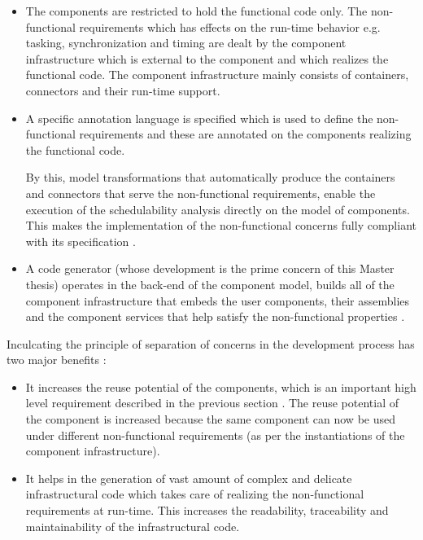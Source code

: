 \begin{description}
\begin{itemize}
\item The components are restricted to hold the functional code only. The non-functional requirements which has effects on the run-time behavior e.g. tasking, synchronization and timing are dealt by the component infrastructure which is external to the component and which realizes the functional code. The component infrastructure mainly consists of containers, connectors and their run-time support.

\item A specific annotation language is specified which is used to define the non-functional requirements and these are annotated on the components realizing the functional code.

By this, model transformations that automatically produce the containers and connectors that serve the non-functional requirements, enable the execution of the schedulability analysis directly on the model of components. This makes the implementation of the non-functional concerns fully compliant with its specification \cite{ScheduAnaly}. 

\item A code generator (whose development is the prime concern of this Master thesis) operates in the back-end of the component model, builds all of the component infrastructure that embeds the user components, their assemblies and the component services that help satisfy the non-functional properties \cite{CharEvoRAVCodeAr}. 
\end{itemize}

Inculcating the principle of separation of concerns in the development process has two major benefits \cite{CompBasedProcess}:

\begin{itemize}
\item It increases the reuse potential of the components, which is an important high level requirement described in the previous section \cite{SAVOIR}. The reuse potential of the component is increased because the same component can now be used under different non-functional requirements (as per the instantiations of the component infrastructure).

\item It helps in the generation of vast amount of complex and delicate infrastructural code which takes care of realizing the non-functional requirements at run-time. This increases the readability, traceability and maintainability of the infrastructural code. 
\end{itemize}


\end{description}
